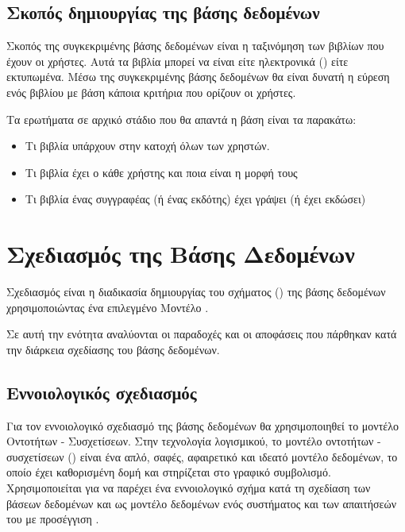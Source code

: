 \documentclass{assignment}
\begin{document}
\subsection{Σκοπός δημιουργίας της βάσης δεδομένων}

Σκοπός της συγκεκριμένης βάσης δεδομένων είναι η ταξινόμηση των βιβλίων που έχουν οι χρήστες. Αυτά τα βιβλία μπορεί να είναι είτε ηλεκτρονικά () είτε εκτυπωμένα. Μέσω της συγκεκριμένης βάσης δεδομένων  θα είναι δυνατή η εύρεση ενός βιβλίου με βάση κάποια κριτήρια που ορίζουν οι χρήστες. 

Τα ερωτήματα σε αρχικό στάδιο που θα απαντά η βάση είναι τα παρακάτω:
\begin{itemize}
  \item Τι βιβλία υπάρχουν στην κατοχή όλων των χρηστών.
  \item Τι βιβλία έχει ο κάθε χρήστης και ποια είναι η μορφή τους
  \item Τι βιβλία ένας συγγραφέας (ή ένας εκδότης) έχει γράψει (ή έχει εκδώσει)
\end{itemize}

\section{Σχεδιασμός της Βάσης Δεδομένων}

Σχεδιασμός είναι η διαδικασία δημιουργίας του σχήματος () της βάσης δεδομένων χρησιμοποιώντας ένα επιλεγμένο Μοντέλο \cite{class_notes}.

Σε αυτή την ενότητα αναλύονται οι παραδοχές και οι αποφάσεις που πάρθηκαν κατά την διάρκεια σχεδίασης του βάσης δεδομένων.

\subsection{Εννοιολογικός σχεδιασμός}
\label{ERmodel}

Για τον εννοιολογικό σχεδιασμό της βάσης δεδομένων θα χρησιμοποιηθεί το μοντέλο Οντοτήτων - Συσχετίσεων.  Στην τεχνολογία λογισμικού, το μοντέλο οντοτήτων - συσχετίσεων () είναι ένα απλό, σαφές, αφαιρετικό και ιδεατό μοντέλο δεδομένων, το οποίο έχει καθορισμένη δομή και στηρίζεται στο γραφικό συμβολισμό. Χρησιμοποιείται για να παρέχει ένα εννοιολογικό σχήμα κατά τη σχεδίαση των βάσεων δεδομένων και ως μοντέλο δεδομένων ενός συστήματος και των απαιτήσεών του με  προσέγγιση \cite{wiki:Entity_relationship_model, class_notes}.
\end{document}
